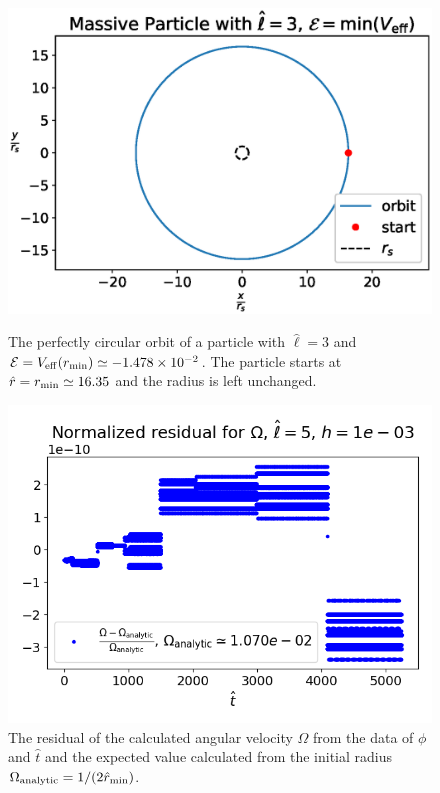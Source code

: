 \begin{figure}[h]
    \begin{minipage}{0.48\textwidth}
        \centering
        \includegraphics[width=\textwidth]{Figures/chapter2/circular_orbit.eps}
        \caption{The perfectly circular orbit of a particle with $\hat \ell = 3$
        and $\mathcal E = V_{\rm eff}(r_{\rm min}) \simeq \num{-1.478e-02}$.
        The particle starts at $\hat r = r_{\rm min} \simeq 16.35$ and the
        radius is left unchanged.}
        \label{cap2:fig:circ_orbit}
    \end{minipage}
    \hspace{0.015 \textwidth}
    \begin{minipage}{0.48\textwidth}
        \centering
        \includegraphics[width=\textwidth]{Figures/chapter2/circular_orbit_res.png}
        \caption{The residual of the calculated angular velocity $\Omega$ from the
        data of $\phi$ and $\hat t$ and the expected value calculated from the
        initial radius $\Omega_{\rm analytic} = 1 / (2 \hat r_{\rm min})$.}
        \label{cap2:fig:circ_orbit_res}
    \end{minipage}
\end{figure}

